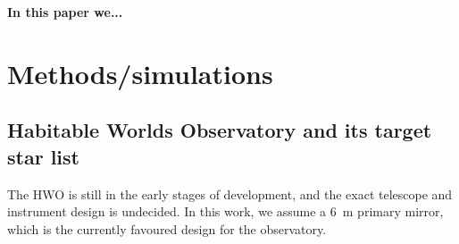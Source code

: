 \documentclass[
    usenatbib,
]{mnras}
\begin{document}
\textbf{In this paper we...}






 



\section{Methods/simulations}
\subsection{Habitable Worlds Observatory and its target star list}
The HWO is still in the early stages of development, and the exact telescope and instrument design is undecided. 
In this work, we assume a \SI{6}{\meter} primary mirror, which is the currently favoured design for the observatory.
\end{document}
